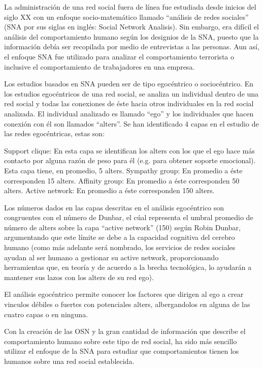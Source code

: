 La administración de una red social fuera de línea fue estudiada desde inicios del siglo XX\cite[pag.3]{dynamics} con un enfoque socio-matemático llamado “análisis de redes sociales” (SNA por sus siglas en inglés: Social Network Analisis). Sin embargo, era difícil el análisis del comportamiento humano según los designios de la SNA, puesto que la información debía ser recopilada por medio de entrevistas a las personas. Aun así, el enfoque SNA fue utilizado para analizar el comportamiento terrorista o inclusive el comportamiento de trabajadores en una empresa.\cite[pag.6-13]{sna_startups}

Los estudios basados en SNA pueden ser de tipo egocéntrico o sociocéntrico\cite{user_behavior}. En los estudios egocéntricos de una red social, se analiza un individual dentro de una red social y todas las conexiones de éste hacia otros individuales en la red social analizada. El individual analizado es llamado “ego” y los individuales que hacen conexión con él son llamados “alters”. Se han identificado 4 capas en el estudio de las redes egocéntricas, estas son:

Support clique: En esta capa se identifican los alters con los que el ego hace más contacto por alguna razón de peso para él (e.g. para obtener soporte emocional). Esta capa tiene, en promedio, 5 alters.
Sympathy group: En promedio a éste corresponden 15 alters.
Affinity group: En promedio a éste corresponden 50 alters.
Active network: En promedio a éste corresponden 150 alters.

Los números dados en las capas descritas en el análisis egocéntrico son congruentes con el número de Dunbar, el cúal representa el umbral promedio de número de alters sobre la capa “active network” (150) según Robin Dunbar, argumentando que este límite se debe a la capacidad cognitiva del cerebro humano\cite[pag.3]{dynamics} (como más adelante será nombrado, los servicios de redes sociales ayudan al ser humano a gestionar su active network, proporcionando herramientas que, en teoría y de acuerdo a la brecha tecnológica, lo ayudarán a mantener sus lazos con los alters de su red ego).

El análisis egocéntrico permite conocer los factores que dirigen al ego a crear vinculos débiles o fuertes con potenciales alters, albergandolos en alguna de las cuatro capas o en ninguna.

Con la creación de las OSN y la gran cantidad de información que describe el comportamiento humano sobre este tipo de red social, ha sido más sencillo utilizar el enfoque de la SNA para estudiar que comportamientos tienen los humanos sobre una red social establecida.

